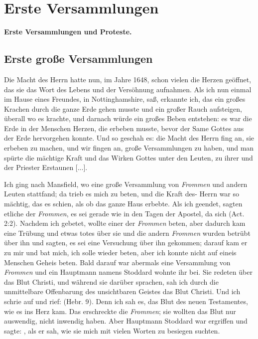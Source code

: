\chapter[Erste Versammlungen]{Erste Versammlungen}

\begin{center}
\textbf{Erste Versammlungen und Proteste.}
\end{center}

\section{Erste große Versammlungen}
Die Macht des Herrn  hatte nun, im Jahre 1648, schon vielen
die Herzen geöffnet, das sie das Wort des Lebens und der 
Versöhnung aufnahmen. Als ich nun einmal im Hause eines Freundes,
in Nottinghamshire, saß, erkannte ich, das ein großes Krachen
durch die ganze Erde gehen musste und ein großer Rauch 
aufsteigen, überall wo es krachte, und darnach würde ein großes
Beben entstehen: es war die Erde in der Menschen Herzen, die
erbeben musste, bevor der Same Gottes aus der Erde 
hervorgehen konnte. Und so geschah es: die Macht des Herrn  fing an,
sie erbeben zu machen, und wir fingen an, große Versammlungen
zu haben, und man spürte die mächtige Kraft und das Wirken
Gottes unter den Leuten, zu ihrer und der Priester Erstaunen [...].

Ich ging nach Mansfield, wo eine große Versammlung von
\textit{Frommen} und andern Leuten stattfand; da trieb es mich zu
beten, und die Kraft des- Herrn  war so mächtig, das es schien,
als ob das ganze Haus erbebte. Als ich geendet, sagten etliche
der \textit{Frommen}, es sei gerade wie in den Tagen der Apostel, da
sich  
(Act. 2:2).
Nachdem ich gebetet, wollte einer der \textit{Frommen} beten, aber
dadurch kam eine Trübung und etwas totes über sie und die
andern \textit{Frommen} wurden betrübt über ihn und sagten, es sei
eine Versuchung über ihn gekommen; darauf kam er zu mir und
bat mich, ich solle wieder beten, aber ich konnte nicht auf 
eineis Menschen Geheis beten.
Bald darauf war abermals eine Versammlung von \textit{Frommen}
und ein Hauptmann namens Stoddard wohnte ihr bei. Sie
redeten über das Blut Christi, 
und während sie darüber sprachen,
sah ich durch die unmittelbare Offenbarung des unsichtbaren
Geistes das Blut Christi. Und ich schrie auf und rief:  (Hebr. 9). 
Denn ich sah es, das Blut des neuen Testamentes, 
wie es ins Herz kam. Das
erschreckte die \textit{Frommen}; sie wollten das Blut nur 
auswendig, nicht inwendig haben. Aber 
Hauptmann Stoddard war ergriffen
und sagte: , als er sah,
wie sie mich mit vielen Worten zu besiegen suchten.

